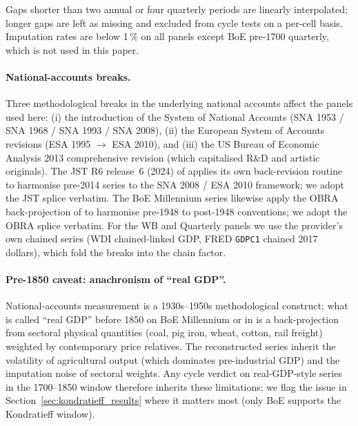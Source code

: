 Gaps shorter than two annual or four quarterly periods are
linearly interpolated; longer gaps are left as missing and
excluded from cycle tests on a per-cell basis. Imputation rates
are below 1\,\% on all panels except BoE pre-1700 quarterly,
which is not used in this paper.

\paragraph{National-accounts breaks.}
Three methodological breaks in the underlying national accounts
affect the panels used here: (i) the introduction of the
System of National Accounts (SNA 1953 / SNA 1968 / SNA 1993 /
SNA 2008), (ii) the European System of Accounts revisions
(ESA 1995 \(\to\) ESA 2010), and (iii) the US Bureau of
Economic Analysis 2013 comprehensive revision (which
capitalised R\&D and artistic originals). The JST R6
release~6 (2024) of \citet{jorda_schularick_taylor2017} applies
its own back-revision routine to harmonise pre-2014 series to
the SNA 2008 / ESA 2010 framework; we adopt the JST splice
verbatim. The BoE Millennium series likewise apply the OBRA
back-projection of \citet{thomas_dimsdale2017} to harmonise
pre-1948 to post-1948 conventions; we adopt the OBRA splice
verbatim. For the WB and Quarterly panels we use the
provider's own chained series (WDI chained-linked GDP, FRED
\texttt{GDPC1} chained 2017 dollars), which fold the breaks
into the chain factor.

\paragraph{Pre-1850 caveat: anachronism of ``real GDP''.}
National-accounts measurement is a 1930s--1950s
methodological construct; what is called ``real GDP'' before
1850 on BoE Millennium or in
\citet{deane_cole1962,feinstein1972,maddison1991,mitchell2003ihs}
is a back-projection from sectoral physical quantities (coal,
pig iron, wheat, cotton, rail freight) weighted by
contemporary price relatives. The reconstructed series
inherit the volatility of agricultural output (which
dominates pre-industrial GDP) and the imputation noise of
sectoral weights. Any cycle verdict on real-GDP-style series
in the 1700--1850 window therefore inherits these
limitations; we flag the issue in
Section~\ref{sec:kondratieff_results} where it matters most
(only BoE supports the Kondratieff window).

